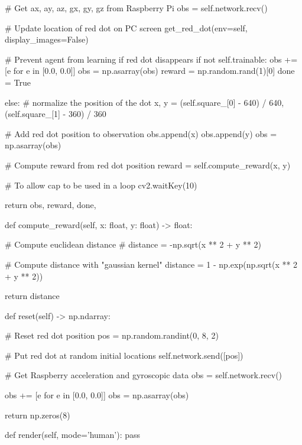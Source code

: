 \begin{pyverbatim}
        # Get ax, ay, az, gx, gy, gz from Raspberry Pi
        obs = self.network.recv()

        # Update location of red dot on PC screen
        get_red_dot(env=self, display_images=False)

        # Prevent agent from learning if red dot disappears
        if not self.trainable:
            obs += [e for e in [0.0, 0.0]]
            obs = np.asarray(obs)
            reward = np.random.rand(1)[0]
            done = True

        else:
            # normalize the position of the dot
            x, y = (self.square_[0] - 640) / 640, (self.square_[1] - 360) / 360

            # Add red dot position to observation
            obs.append(x)
            obs.append(y)
            obs = np.asarray(obs)

            # Compute reward from red dot position
            reward = self.compute_reward(x, y)

        # To allow cap to be used in a loop
        cv2.waitKey(10)

        return obs, reward, done, {}

    def compute_reward(self, x: float, y: float) -> float:

        # Compute euclidean distance
        # distance = -np.sqrt(x ** 2 + y ** 2)

        # Compute distance with "gaussian kernel"
        distance = 1 - np.exp(np.sqrt(x ** 2 + y ** 2))

        return distance

    def reset(self) -> np.ndarray:

        # Reset red dot position
        pos = np.random.randint(0, 8, 2)

        # Put red dot at random initial locations
        self.network.send([pos])

        # Get Raspberry acceleration and gyroscopic data
        obs = self.network.recv()

        obs += [e for e in [0.0, 0.0]]
        obs = np.asarray(obs)

        return np.zeros(8)

    def render(self, mode='human'):
        pass

\end{pyverbatim}

